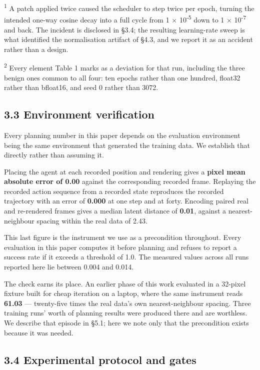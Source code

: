 \documentclass[10pt]{article}
\begin{document}
\textsuperscript{1} A patch applied twice caused the scheduler to step twice per epoch, turning
the intended one-way cosine decay into a full cycle from 1 $\times$ 10\textsuperscript{-5} down to
1 $\times$ 10\textsuperscript{-7} and back. The incident is disclosed in \S{}3.4; the resulting learning-rate
sweep is what identified the normalisation artifact of \S{}4.3, and we report it
as an accident rather than a design.

\textsuperscript{2} Every element Table 1 marks as a deviation for that run, including the three
benign ones common to all four: ten epochs rather than one hundred, float32
rather than bfloat16, and seed 0 rather than 3072.

\subsection{3.3 Environment verification}\label{environment-verification}

Every planning number in this paper depends on the evaluation environment being
the same environment that generated the training data. We establish that
directly rather than assuming it.

Placing the agent at each recorded position and rendering gives a \textbf{pixel mean
absolute error of 0.00} against the corresponding recorded frame. Replaying the
recorded action sequence from a recorded state reproduces the recorded
trajectory with an error of \textbf{0.000} at one step and at forty. Encoding paired
real and re-rendered frames gives a median latent distance of \textbf{0.01}, against
a nearest-neighbour spacing within the real data of 2.43.

This last figure is the instrument we use as a precondition throughout. Every
evaluation in this paper computes it before planning and refuses to report a
success rate if it exceeds a threshold of 1.0. The measured values across all runs reported here lie between 0.004 and 0.014.

The check earns its place. An earlier phase of this work evaluated in a
32-pixel fixture built for cheap iteration on a laptop, where the same
instrument reads \textbf{61.03} --- twenty-five times the real data's own
nearest-neighbour spacing. Three training runs' worth of planning results were
produced there and are worthless. We describe that episode in \S{}5.1; here we note
only that the precondition exists because it was needed.

\subsection{3.4 Experimental protocol and gates}\label{experimental-protocol-and-gates}
\end{document}
